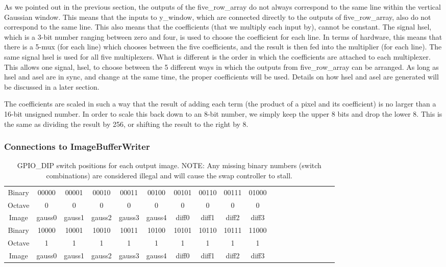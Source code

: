 As we pointed out in the previous section, the outputs of the five\_row\_array do 
not always correspond to the same line within the vertical Gaussian window. This 
means that the inputs to y\_window, which are connected directly to the outputs 
of five\_row\_array, also do not correspond to the same line. This also means that 
the coefficients (that we multiply each input by), cannot be constant. The 
signal hsel, which is a 3-bit number ranging between zero and four, is used to 
choose the coefficient for each line. In terms of hardware, this means that 
there is a 5-mux (for each line) which chooses between the five coefficients, 
and the result is then fed into the multiplier (for each line). The same signal 
hsel is used for all five multiplexers. What is different is the order in which 
the coefficients are attached to each multiplexer. This allows one signal, hsel, 
to choose between the 5 different ways in which the outputs from five\_row\_array 
can be arranged. As long as hsel and asel are in sync, and change at the same 
time, the proper coefficients will be used. Details on how hsel and asel are 
generated will be discussed in a later section.

The coefficients are scaled in such a way that the result of adding each term 
(the product of a pixel and its coefficient) is no larger than a 16-bit unsigned 
number. In order to scale this back down to an 8-bit number, we simply keep the 
upper 8 bits and drop the lower 8. This is the same as dividing the result by 
256, or shifting the result to the right by 8.

\subsubsection{Connections to ImageBufferWriter}

\begin{table}


    \begingroup
    \tiny
    \caption{ GPIO\_DIP switch positions for each output image. NOTE: Any missing binary numbers (switch combinations) are considered illegal and will cause the swap controller to stall.} \label{wrap-tab:1} 
\begin{tabular}{ c | c | c | c | c | c | c | c | c | c | c | c | c | c | c | c | c | c | c } 
Binary & 00000 & 00001 & 00010 & 00011 & 00100 & 00101 & 00110 & 00111 & 01000 \\ 
Octave & 0 & 0 & 0 & 0 & 0 & 0 & 0 & 0 & 0 \\
Image & gauss0 & gauss1 & gauss2 & gauss3 & gauss4 & diff0 & diff1 & diff2 & diff3 \\ \toprule
Binary & 10000 & 10001 & 10010 & 10011 & 10100 & 10101 & 10110 & 10111 & 11000 \\
Octave & 1 & 1 & 1 & 1 & 1 & 1 & 1 & 1 & 1 \\
Image & gauss0 & gauss1 & gauss2 & gauss3 & gauss4 & diff0 & diff1 & diff2 & diff3 \\
\end{tabular}
\endgroup 
\end{table}



